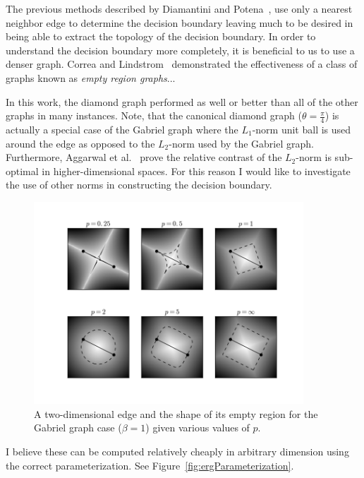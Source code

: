 \documentclass[12pt]{article}
\begin{document}
The previous methods described by Diamantini and
Potena~\cite{DiamantiniPotena2007}, use only a nearest neighbor edge to
determine the decision boundary leaving much to be desired in being able to
extract the topology of the decision boundary.
%
In order to understand the decision boundary more completely, it is beneficial
to us to use a denser graph.
%
Correa and Lindstrom~\cite{CorreaLindstrom2011} demonstrated the effectiveness
of a class of graphs known as \emph{empty region graphs}...

In this work, the diamond graph performed as well or better than all of the
other graphs in many instances.
%
Note, that the canonical diamond graph ($\theta=\frac{\pi}{4}$) is actually a
special case of the Gabriel graph where the $L_1$-norm unit ball is used around
the edge as opposed to the $L_2$-norm used by the Gabriel graph.
%
Furthermore, Aggarwal et al.~\cite{AggarwalHinneburgKeim2001} prove the relative
contrast of the $L_2$-norm is sub-optimal in higher-dimensional spaces.
%
For this reason I would like to investigate the use of other norms in
constructing the decision boundary.

\begin{figure}[!ht]
  \centering
  \includegraphics[width=0.9\textwidth]{figs/chap6/emptyRegions}
  \caption[Gabriel graph empty regions using various $L_p$-norms]{A
  two-dimensional edge and the shape of its empty region for the Gabriel graph
  case ($\beta=1$) given various values of $p$.}
  \label{fig:ergs}
\end{figure}

I believe these can be computed relatively cheaply in arbitrary dimension using
the correct parameterization. See Figure~\ref{fig:ergParameterization}.
\end{document}
